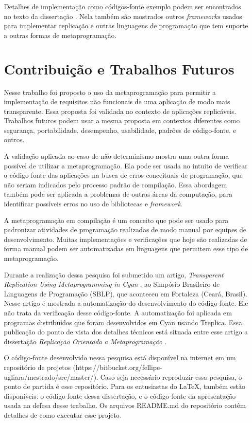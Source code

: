 \documentclass[12pt]{article}
\begin{document}
Detalhes de implementação como códigos-fonte exemplo podem ser encontrados 
no texto da dissertação \cite{fellipe:2018}. Nela também são mostrados outros \textit{frameworks}
usados para implementar replicação e outras linguagens de programação que 
tem suporte a outras formas de metaprogramação. 

\section{Contribuição e Trabalhos Futuros }

Nesse trabalho foi proposto o uso da metaprogramação para permitir a implementação 
de requisitos não funcionais de uma aplicação de modo mais transparente. Essa 
proposta foi validada no contexto de aplicações replicáveis. Trabalhos futuros podem
usar a mesma proposta em contextos diferentes como segurança, portabilidade, 
desempenho, usabilidade, padrões de código-fonte, e outros.

A validação aplicada ao caso de não determinismo mostra uma outra forma possível de 
utilizar a metaprogramação. Ela pode ser usada no intuito de verificar o código-fonte 
das aplicações na busca de erros conceituais de programação, que não seriam indicados
pelo processo padrão de compilação. Essa abordagem também pode ser aplicada a problemas 
de outras áreas da computação, para identificar possíveis erros no uso de bibliotecas
e \textit{framework}.

A metaprogramação em compilação é um conceito que pode ser usado para 
padronizar atividades de programação realizadas de modo manual por equipes de 
desenvolvimento. Muitas implementações e verificações que hoje são realizadas de forma 
manual podem ser automatizadas em linguagens que permitem esse tipo de metaprogramação.

Durante a realização dessa pesquisa foi submetido um artigo, \textit{Transparent Replication 
Using Metaprogramming in Cyan} \cite{sblp:2018}, ao Simpósio Brasileiro de 
Linguagens de Programação (SBLP), que aconteceu em Fortaleza (Ceará, Brasil).
Nesse artigo é mostrada a automatização do desenvolvimento do código-fonte. Ele não
trata da verificação desse código-fonte. A automatização foi aplicada em programas
distribuídos que foram desenvolvidos em Cyan usando Treplica. Essa publicação do ponto de vista 
dos detalhes técnicos está situada entre esse artigo a dissertação 
\textit{Replicação Orientada a Metaprogramação} \cite{fellipe:2018}.

O código-fonte desenvolvido nessa pesquisa está disponível na internet em um
repositório de projetos (https://bitbucket.org/fellipe-ugliara/mestrado/src/master/). 
Caso seja necessário reproduzir essa pesquisa, o ponto de partida
é esse repositório. Para os entusiastas do \LaTeX, também estão disponíveis: o código-fonte
dessa dissertação, e o código-fonte da apresentação usada na defesa desse trabalho. Os
arquivos README.md do repositório contêm detalhes de como executar esse projeto.



\end{document}

